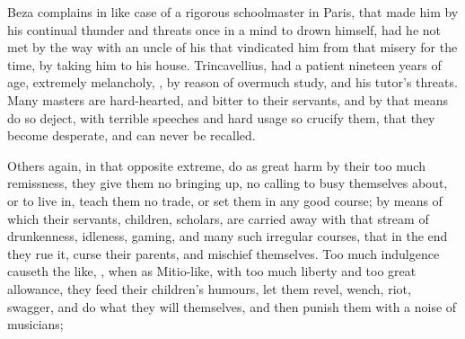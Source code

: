 Beza complains in like case of a rigorous schoolmaster in
Paris, that made him by his continual thunder and threats once in a mind to
drown himself, had he not met by the way with an uncle of his that vindicated
him from that misery for the time, by taking him to his house. Trincavellius,
 had a patient nineteen years of age,
extremely melancholy, ,
by reason of overmuch study, and his tutor's threats. Many
masters are hard-hearted, and bitter to their servants, and by that means do so
deject, with terrible speeches and hard usage so crucify them, that they become
desperate, and can never be recalled.

Others again, in that opposite extreme, do as great harm by their too much
remissness, they give them no bringing up, no calling to busy themselves about,
or to live in, teach them no trade, or set them in any good course; by means of
which their servants, children, scholars, are carried away with that stream of
drunkenness, idleness, gaming, and many such irregular courses, that in the end
they rue it, curse their parents, and mischief themselves. Too much indulgence
causeth the like, , when as Mitio-like, with too much liberty and too great allowance, they
feed their children's humours, let them revel, wench, riot, swagger, and do
what they will themselves, and then punish them with a noise of musicians;


